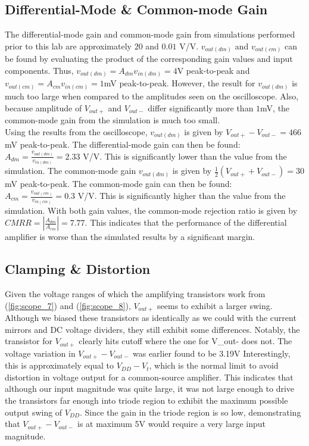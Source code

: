 \subsection{Differential-Mode \& Common-mode Gain}

The differential-mode gain and common-mode gain from simulations performed prior to this lab are approximately $20$ and $0.01$ \si{\volt}/\si{\volt}.
$v_{out(dm)}$ and $v_{out(cm)}$ can be found by evaluating the product of the corresponding gain values and input components.
Thus, $v_{out(dm)} = A_{dm}v_{in(dm)} = 4$\si{\volt} peak-to-peak and $v_{out(cm)} = A_{cm}v_{in(cm)} = 1$\si{\milli\volt} peak-to-peak.
However, the result for $v_{out(dm)}$ is much too large when compared to the amplitudes seen on the oscilloscope.
Also, because amplitude of $V_{out+}$ and $V_{out-}$ differ significantly more than $1$\si{\milli\volt}, the common-mode gain from the simulation is much too small.\\

Using the results from the oscilloscope, $v_{out(dm)}$ is given by $V_{out+} - V_{out-} = 466$\si{\milli\volt} peak-to-peak.
The differential-mode gain can then be found: $A_{dm} = \frac{v_{out(dm)}}{v_{in(dm)}} = 2.33$ \si{\volt}/\si{\volt}.
This is significantly lower than the value from the simulation.
The common-mode gain $v_{out(dm)}$ is given by $\frac{1}{2}(V_{out+} + V_{out-}) = 30$\si{\milli\volt} peak-to-peak.
The common-mode gain can then be found: $A_{cm} = \frac{v_{out(cm)}}{v_{in(cm)}} = 0.3$ \si{\volt}/\si{\volt}.
This is significantly higher than the value from the simulation.
With both gain values, the common-mode rejection ratio is given by $CMRR = |\frac{A_{dm}}{A_{cm}}| = 7.77$.
This indicates that the performance of the differential amplifier is worse than the simulated results by a significant margin. \\

\subsection{Clamping \& Distortion}

Given the voltage ranges of which the amplifying transistors work from (\ref{fig:scope_7}) and (\ref{fig:scope_8}), $V_{out+}$ seems to exhibit a larger swing.
Although we biased these transistors as identically as we could with the current mirrors and DC voltage dividers, they still exhibit some differences.
Notably, the transistor for $V_{out+}$ clearly hits cutoff where the one for V_{out-} does not.
The voltage variation in $V_{out+} - V_{out-}$ was earlier found to be 3.19\si{\volt}
Interestingly, this is approximately equal to $V_{DD} - V_{t}$, which is the normal limit to avoid distortion in voltage output for a common-source amplifier.
This indicates that although our input magnitude was quite large, it was not large enough to drive the transistors far enough into triode region to exhibit the maximum possible output swing of $V_{DD}$.
Since the gain in the triode region is so low, demonstrating that $V_{out+} - V_{out-}$ is at maximum 5V would require a very large input magnitude.

